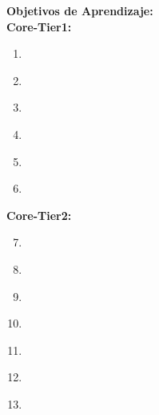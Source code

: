\noindent \textbf{Objetivos de Aprendizaje:}\\
\noindent \textbf{Core-Tier1:}
\begin{enumerate}
	\setcounter{enumi}{0}
	\item \IMInformationManagementConceptsLODescribeHowAccess\xspace[\IMInformationManagementConceptsLODescribeHowAccessLevel]\label{sec:BOK:IMInformationManagementConceptsLODescribeHowAccess}
	\item \IMInformationManagementConceptsLODescribeTheDisadvantages\xspace[\IMInformationManagementConceptsLODescribeTheDisadvantagesLevel]\label{sec:BOK:IMInformationManagementConceptsLODescribeTheDisadvantages}
	\item \IMInformationManagementConceptsLOIdentifyTheAssociated\xspace[\IMInformationManagementConceptsLOIdentifyTheAssociatedLevel]\label{sec:BOK:IMInformationManagementConceptsLOIdentifyTheAssociated}
	\item \IMInformationManagementConceptsLOCompareAndWith\xspace[\IMInformationManagementConceptsLOCompareAndWithLevel]\label{sec:BOK:IMInformationManagementConceptsLOCompareAndWith}
	\item \IMInformationManagementConceptsLODemonstrateUses\xspace[\IMInformationManagementConceptsLODemonstrateUsesLevel]\label{sec:BOK:IMInformationManagementConceptsLODemonstrateUses}
	\item \IMInformationManagementConceptsLOIdentifyIssues\xspace[\IMInformationManagementConceptsLOIdentifyIssuesLevel]\label{sec:BOK:IMInformationManagementConceptsLOIdentifyIssues}
\end{enumerate}
\noindent \textbf{Core-Tier2:}
\begin{enumerate}
	\setcounter{enumi}{6}
	\item \IMInformationManagementConceptsLOCritique\xspace[\IMInformationManagementConceptsLOCritiqueLevel]\label{sec:BOK:IMInformationManagementConceptsLOCritique}
	\item \IMInformationManagementConceptsLOExplainUses\xspace[\IMInformationManagementConceptsLOExplainUsesLevel]\label{sec:BOK:IMInformationManagementConceptsLOExplainUses}
	\item \IMInformationManagementConceptsLOGiveA\xspace[\IMInformationManagementConceptsLOGiveALevel]\label{sec:BOK:IMInformationManagementConceptsLOGiveA}
	\item \IMInformationManagementConceptsLODescribeSeveralTo\xspace[\IMInformationManagementConceptsLODescribeSeveralToLevel]\label{sec:BOK:IMInformationManagementConceptsLODescribeSeveralTo}
	\item \IMInformationManagementConceptsLOExplainMeasures\xspace[\IMInformationManagementConceptsLOExplainMeasuresLevel]\label{sec:BOK:IMInformationManagementConceptsLOExplainMeasures}
	\item \IMInformationManagementConceptsLODescribeApproaches\xspace[\IMInformationManagementConceptsLODescribeApproachesLevel]\label{sec:BOK:IMInformationManagementConceptsLODescribeApproaches}
	\item \IMInformationManagementConceptsLOIdentifyVulnerabilities\xspace[\IMInformationManagementConceptsLOIdentifyVulnerabilitiesLevel]\label{sec:BOK:IMInformationManagementConceptsLOIdentifyVulnerabilities}
\end{enumerate}


